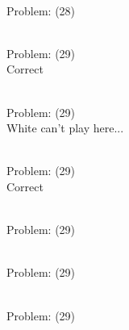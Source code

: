 \documentclass[11pt]{article}
\begin{document}
\begin{minipage}[t]{0.5\textwidth}
  {\centering
  
\\
Problem: (28)\\
  }
\end{minipage}
\begin{minipage}[t]{0.5\textwidth}
  {\centering
  
\\
Problem: (29)\\
Correct\\
  }
\end{minipage}
\begin{minipage}[t]{0.5\textwidth}
  {\centering
  
\\
Problem: (29)\\
White can't play here...\\
  }
\end{minipage}
\begin{minipage}[t]{0.5\textwidth}
  {\centering
  
\\
Problem: (29)\\
Correct\\
  }
\end{minipage}
\begin{minipage}[t]{0.5\textwidth}
  {\centering
  
\\
Problem: (29)\\
  }
\end{minipage}
\begin{minipage}[t]{0.5\textwidth}
  {\centering
  
\\
Problem: (29)\\
  }
\end{minipage}
\begin{minipage}[t]{0.5\textwidth}
  {\centering
  
\\
Problem: (29)\\
  }
\end{minipage}
\end{document}
